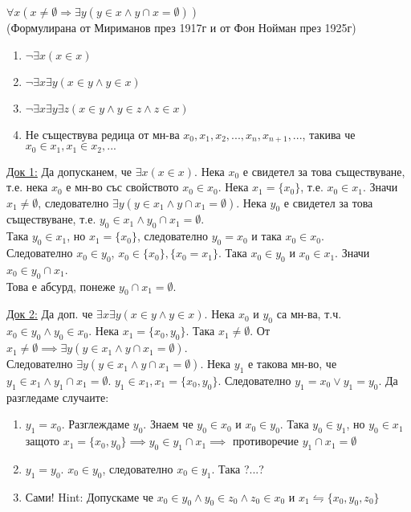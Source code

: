 \documentclass[fleqn, titlepage, 12pt]{report}
\begin{document}
$ \forall{x} (x \neq \emptyset \Rightarrow \exists{y} (y \in x \land y \cap x = \emptyset ))$\\
(Формулирана от Мириманов през 1917г и от Фон Нойман през 1925г)
\bigbreak

\begin{enumerate}
  \item $ \lnot \exists{x} (x \in x)$
  \item $ \lnot \exists{x} \exists{y} (x \in y \land y \in x)$
  \item $ \lnot \exists{x} \exists{y} \exists{z} (x \in y \land y \in z \land z \in x)$
  \item Не съществува редица от мн-ва $x_0, x_1, x_2, ..., x_n, x_{n+1}, ...$, такива че$x_0 \in x_1, x_1 \in x_2, ...$
\end{enumerate}
\bigbreak

\underline{Док 1:} Да допусканем, че $ \exists{x} (x \in x)$. Нека $x_0$ е свидетел за това съществуване, т.е. нека $x_0$ е
мн-во със свойството $x_0 \in x_0$. Нека $x_1 = \{ x_0\}$, т.е. $x_0 \in x_1$. Значи $x_1 \neq \emptyset$, следователно
$ \exists{y} (y \in x_1 \land y \cap x_1 = \emptyset)$. Нека $y_0$ е свидетел за това съществуване, т.е. $y_0 \in x_1 \land y_0 \cap x_1 = \emptyset$.\\
Така $y_0 \in x_1$, но $x_1 = \{ x_0\}$, следователно $y_0 = x_0$ и така $x_0 \in x_0$.\\
Следователно $x_0 \in y_0$, $x_0 \in \{ x_0\}, \{ x_0 = x_1\}$. Така $x_0 \in y_0$ и $x_0 \in x_1$. Значи $x_0 \in y_0 \cap x_1$.\\
Това е абсурд, понеже $y_0 \cap x_1 = \emptyset$.
\bigbreak

\underline{Док 2:} Да доп. че $ \exists{x} \exists{y} (x \in y \land y \in x)$. Нека $x_0$ и $y_0$ са мн-ва, т.ч.
$x_0 \in y_0 \land  y_0 \in x_0$. Нека $x_1 = \{ x_0, y_0\}$. Така $x_1 \neq \emptyset$. От $x_1 \neq \emptyset \implies \exists{y} (y \in x_1 \land  y \cap x_1 = \emptyset)$.\\
Следователно $ \exists{y} (y \in x_1 \land  y \cap x_1 = \emptyset)$. Нека $y_1$ е такова мн-во, че $y_1 \in x_1 \land  y_1 \cap x_1 = \emptyset$. $y_1 \in x_1, x_1 = \{ x_0, y_0\}$. Следователно $y_1 = x_0 \lor y_1 = y_0$. Да разгледаме случаите:
\begin{enumerate}
  \item $y_1 = x_0$. Разглеждаме $y_0$. Знаем че $y_0 \in x_0$ и $x_0 \in y_0$. Така $y_0 \in y_1$, но $y_0 \in x_1$ защото $x_1 = \{ x_0, y_0 \} \implies y_0 \in y_1 \cap x_1 \implies$ противоречие $y_1 \cap x_1 = \emptyset$
  \item $y_1 = y_0$. $x_0 \in y_0$, следователно $x_0 \in y_1$. Така ?...?
  \item Сами! Hint: Допускаме че $x_0 \in y_0 \land  y_0 \in z_0 \land  z_0 \in x_0$ и $x_1 \leftrightharpoons \{ x_0, y_0, z_0\}$
\end{enumerate}
\end{document}
